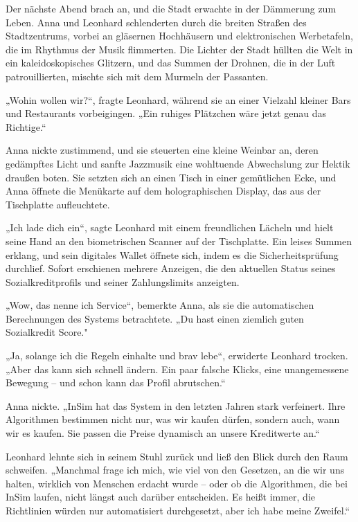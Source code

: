 \documentclass[
]{article}
\begin{document}
Der nächste Abend brach an, und die Stadt erwachte in der Dämmerung zum
Leben. Anna und Leonhard schlenderten durch die breiten Straßen des
Stadtzentrums, vorbei an gläsernen Hochhäusern und elektronischen
Werbetafeln, die im Rhythmus der Musik flimmerten. Die Lichter der Stadt
hüllten die Welt in ein kaleidoskopisches Glitzern, und das Summen der
Drohnen, die in der Luft patrouillierten, mischte sich mit dem Murmeln
der Passanten.

„Wohin wollen wir?{\kern0pt}``, fragte Leonhard, während sie an einer
Vielzahl kleiner Bars und Restaurants vorbeigingen. „Ein ruhiges
Plätzchen wäre jetzt genau das Richtige.``

Anna nickte zustimmend, und sie steuerten eine kleine Weinbar an, deren
gedämpftes Licht und sanfte Jazzmusik eine wohltuende Abwechslung zur
Hektik draußen boten. Sie setzten sich an einen Tisch in einer
gemütlichen Ecke, und Anna öffnete die Menükarte auf dem holographischen
Display, das aus der Tischplatte aufleuchtete.

„Ich lade dich ein``, sagte Leonhard mit einem freundlichen Lächeln und
hielt seine Hand an den biometrischen Scanner auf der Tischplatte. Ein
leises Summen erklang, und sein digitales Wallet öffnete sich, indem es
die Sicherheitsprüfung durchlief. Sofort erschienen mehrere Anzeigen,
die den aktuellen Status seines Sozialkreditprofils und seiner
Zahlungslimits anzeigten.

„Wow, das nenne ich Service``, bemerkte Anna, als sie die automatischen
Berechnungen des Systems betrachtete. „Du hast einen ziemlich guten
Sozialkredit Score."

„Ja, solange ich die Regeln einhalte und brav lebe``, erwiderte Leonhard
trocken. „Aber das kann sich schnell ändern. Ein paar falsche Klicks,
eine unangemessene Bewegung -- und schon kann das Profil abrutschen.``

Anna nickte. „InSim hat das System in den letzten Jahren stark
verfeinert. Ihre Algorithmen bestimmen nicht nur, was wir kaufen dürfen,
sondern auch, wann wir es kaufen. Sie passen die Preise dynamisch an
unsere Kreditwerte an.``

Leonhard lehnte sich in seinem Stuhl zurück und ließ den Blick durch den
Raum schweifen. „Manchmal frage ich mich, wie viel von den Gesetzen, an
die wir uns halten, wirklich von Menschen erdacht wurde -- oder ob die
Algorithmen, die bei InSim laufen, nicht längst auch darüber
entscheiden. Es heißt immer, die Richtlinien würden nur automatisiert
durchgesetzt, aber ich habe meine Zweifel.``
\end{document}
